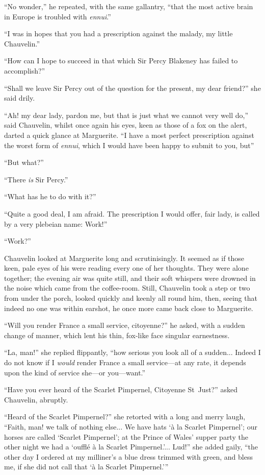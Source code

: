 \enquote{No wonder,} he repeated, with the same gallantry, \enquote{that the most active brain in Europe is troubled with \textit{ennui}.}

\enquote{I was in hopes that you had a prescription against the malady, my little Chauvelin.}

\enquote{How can I hope to succeed in that which Sir Percy Blakeney has failed to accomplish?}

\enquote{Shall we leave Sir Percy out of the question for the present, my dear friend?} she said drily.

\enquote{Ah! my dear lady, pardon me, but that is just what we cannot very well do,} said Chauvelin, whilst once again his eyes, keen as those of a fox on the alert, darted a quick glance at Marguerite. \enquote{I have a most perfect prescription against the worst form of \textit{ennui}, which I would have been happy to submit to you, but\longdash}

\enquote{But what?}

\enquote{There \textit{is} Sir Percy.}

\enquote{What has he to do with it?}

\enquote{Quite a good deal, I am afraid. The prescription I would offer, fair lady, is called by a very plebeian name: Work!}

\enquote{Work?}

Chauvelin looked at Marguerite long and scrutinisingly. It seemed as if those keen, pale eyes of his were reading every one of her thoughts. They were alone together; the evening air was quite still, and their soft whispers were drowned in the noise which came from the coffee-room. Still, Chauvelin took a step or two from under the porch, looked quickly and keenly all round him, then, seeing that indeed no one was within earshot, he once more came back close to Marguerite.

\enquote{Will you render France a small service, citoyenne?} he asked, with a sudden change of manner, which lent his thin, fox-like face singular earnestness.

\enquote{La, man!} she replied flippantly, \enquote{how serious you look all of a sudden... Indeed I do not know if I \textit{would} render France a small service---at any rate, it depends upon the kind of service she---or you---want.}

\enquote{Have you ever heard of the Scarlet Pimpernel, Citoyenne St~Just?} asked Chauvelin, abruptly.

\enquote{Heard of the Scarlet Pimpernel?} she retorted with a long and merry laugh, \enquote{Faith, man! we talk of nothing else... We have hats \enquote{à la Scarlet Pimpernel}; our horses are called \enquote{Scarlet Pimpernel}; at the Prince of Wales’ supper party the other night we had a \enquote{oufflé à la Scarlet Pimpernel.}... Lud!} she added gaily, \enquote{the other day I ordered at my milliner's a blue dress trimmed with green, and bless me, if she did not call that \enquote{à la Scarlet Pimpernel.}}

